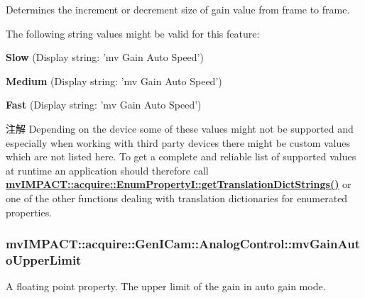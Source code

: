 Determines the increment or decrement size of gain value from frame to frame.

The following string values might be valid for this feature\+:
\begin{DoxyItemize}
\item {\bfseries Slow} (Display string\+: 'mv Gain Auto Speed')
\item {\bfseries Medium} (Display string\+: 'mv Gain Auto Speed')
\item {\bfseries Fast} (Display string\+: 'mv Gain Auto Speed')
\end{DoxyItemize}

\begin{DoxyNote}{注解}
Depending on the device some of these values might not be supported and especially when working with third party devices there might be custom values which are not listed here. To get a complete and reliable list of supported values at runtime an application should therefore call {\bfseries \hyperlink{classmv_i_m_p_a_c_t_1_1acquire_1_1_enum_property_i_a0ba6ccbf5ee69784d5d0b537924d26b6}{mv\+I\+M\+P\+A\+C\+T\+::acquire\+::\+Enum\+Property\+I\+::get\+Translation\+Dict\+Strings()}} or one of the other functions dealing with translation dictionaries for enumerated properties. 
\end{DoxyNote}
\hypertarget{classmv_i_m_p_a_c_t_1_1acquire_1_1_gen_i_cam_1_1_analog_control_a6f4577f138bdafe4556f06bc32b6cf4f}{
\subsubsection[{mv\+Gain\+Auto\+Upper\+Limit}]{ mv\+I\+M\+P\+A\+C\+T\+::acquire\+::\+Gen\+I\+Cam\+::\+Analog\+Control\+::mv\+Gain\+Auto\+Upper\+Limit}}\label{classmv_i_m_p_a_c_t_1_1acquire_1_1_gen_i_cam_1_1_analog_control_a6f4577f138bdafe4556f06bc32b6cf4f}


A floating point property. The upper limit of the gain in auto gain mode. 

